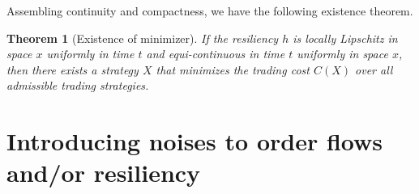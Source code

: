 \documentclass[openany,oneside]{article}
\newtheorem{thm}{Theorem}[section]
\theoremstyle{definition}
\theoremstyle{remark}
\begin{document}
Assembling continuity and compactness, we have the following existence theorem.
\begin{thm}[Existence of minimizer]
If the resiliency $h$ is locally Lipschitz in space $x$ uniformly in time $t$ and equi-continuous in time $t$ uniformly in space $x$, then there exists a strategy $X$ that minimizes the trading cost $C(X)$ over all admissible trading strategies.
\end{thm}




\section{Introducing noises to order flows and/or resiliency}




{}

\end{document}
